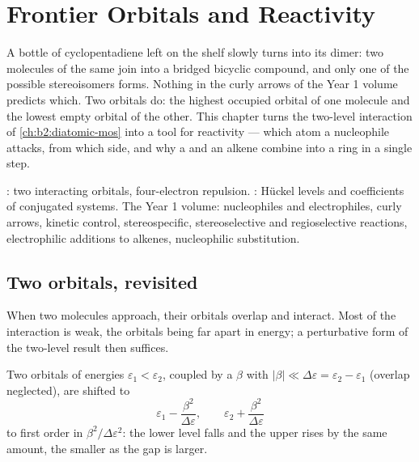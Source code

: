 \chapter{Frontier Orbitals and Reactivity}\label{ch:b2:frontier-orbitals}

A bottle of cyclopentadiene left on the shelf slowly turns into its dimer:
two molecules of the same  join into a bridged bicyclic compound, and
only one of the possible stereoisomers forms. Nothing in the curly arrows of
the Year 1 volume predicts which. Two orbitals do: the highest occupied
orbital of one molecule and the lowest empty orbital of the other. This
chapter turns the two-level interaction of \cref{ch:b2:diatomic-mos} into a
tool for reactivity --- which atom a nucleophile attacks, from which side, and
why a  and an alkene combine into a ring in a single step.

\begin{recall}
: two interacting orbitals, four-electron repulsion.
: Hückel levels and coefficients of conjugated systems.
The Year 1 volume: nucleophiles and electrophiles, curly arrows, kinetic
control, stereospecific, stereoselective and regioselective reactions,
electrophilic additions to alkenes, nucleophilic substitution.
\end{recall}

\section{Two orbitals, revisited}

When two molecules approach, their orbitals overlap and interact. Most of the
interaction is weak, the orbitals being far apart in energy; a perturbative form of
the two-level result then suffices.

\begin{theorem}\label{thm:b2:frontier-orbitals:perturbation}
Two orbitals of energies $\varepsilon_1 < \varepsilon_2$, coupled by a 
$\beta$ with $|\beta| \ll \Delta\varepsilon = \varepsilon_2 - \varepsilon_1$ (overlap neglected), are
shifted to
\[
  \varepsilon_1 - \frac{\beta^2}{\Delta\varepsilon}, \qquad \varepsilon_2 + \frac{\beta^2}{\Delta\varepsilon}
\]
to first order in $\beta^2/\Delta\varepsilon^2$: the lower level falls and the upper rises by the same
amount, the smaller as the gap is larger.
\end{theorem}

